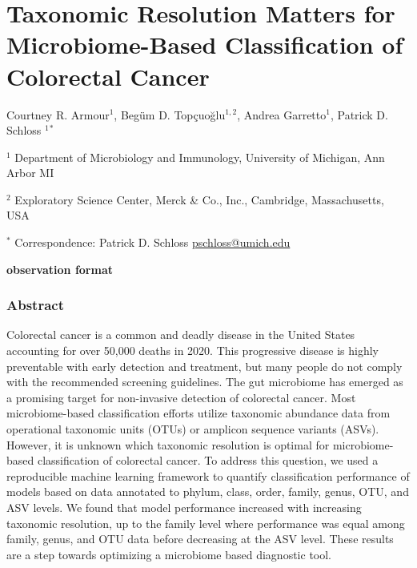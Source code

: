 \documentclass[]{article}
\author{}
\date{\vspace{-2.5em}}
\begin{document}
\section{Taxonomic Resolution Matters for Microbiome-Based
Classification of Colorectal
Cancer}\label{taxonomic-resolution-matters-for-microbiome-based-classification-of-colorectal-cancer}

\vspace{10mm}

Courtney R. Armour${^1}$, Begüm D. Topçuoğlu$^{1,2}$, Andrea
Garretto${^1}$, Patrick D. Schloss ${^1}$${^*}$

\vspace{5mm}

${^1}$ Department of Microbiology and Immunology, University of
Michigan, Ann Arbor MI

${^2}$ Exploratory Science Center, Merck \& Co., Inc., Cambridge,
Massachusetts, USA~

\vspace{5mm}

${^*}$ Correspondence: Patrick D. Schloss
\href{mailto:pschloss@umich.edu}{pschloss@umich.edu}

\vspace{20mm}

\textbf{observation format}

\newpage

\subsubsection{Abstract}\label{abstract}

Colorectal cancer is a common and deadly disease in the United States
accounting for over 50,000 deaths in 2020. This progressive disease is
highly preventable with early detection and treatment, but many people
do not comply with the recommended screening guidelines. The gut
microbiome has emerged as a promising target for non-invasive detection
of colorectal cancer. Most microbiome-based classification efforts
utilize taxonomic abundance data from operational taxonomic units (OTUs)
or amplicon sequence variants (ASVs). However, it is unknown which
taxonomic resolution is optimal for microbiome-based classification of
colorectal cancer. To address this question, we used a reproducible
machine learning framework to quantify classification performance of
models based on data annotated to phylum, class, order, family, genus,
OTU, and ASV levels. We found that model performance increased with
increasing taxonomic resolution, up to the family level where
performance was equal among family, genus, and OTU data before
decreasing at the ASV level. These results are a step towards optimizing
a microbiome based diagnostic tool.
\end{document}

